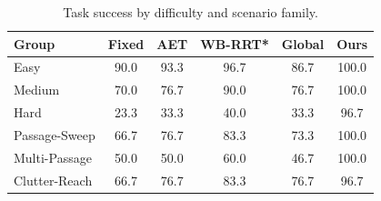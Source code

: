 \begin{table}[t]
\centering
\caption{Task success by difficulty and scenario family.}
\label{tab:success_breakdown}
\begin{tabular}{lccccc}
\toprule
Group & Fixed & AET & WB-RRT* & Global & Ours \\
\midrule
Easy & 90.0 & 93.3 & 96.7 & 86.7 & 100.0 \\
Medium & 70.0 & 76.7 & 90.0 & 76.7 & 100.0 \\
Hard & 23.3 & 33.3 & 40.0 & 33.3 & 96.7 \\
\midrule
Passage-Sweep & 66.7 & 76.7 & 83.3 & 73.3 & 100.0 \\
Multi-Passage & 50.0 & 50.0 & 60.0 & 46.7 & 100.0 \\
Clutter-Reach & 66.7 & 76.7 & 83.3 & 76.7 & 96.7 \\
\bottomrule
\end{tabular}
\end{table}
